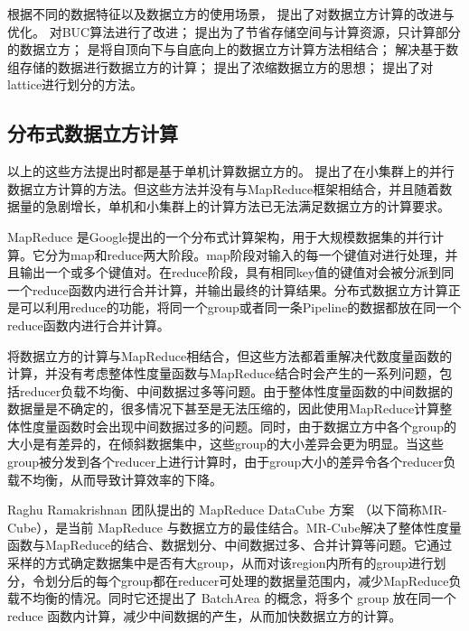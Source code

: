 根据不同的数据特征以及数据立方的使用场景，\cite{han2001efficient} \cite{harinarayan1996implementing} \cite{xin2003star}  \cite{zhao1997array}  \cite{wang2002condensed} \cite{ross1997fast} 提出了对数据立方计算的改进与优化。\cite{han2001efficient} 对BUC算法进行了改进； \cite{harinarayan1996implementing} 提出为了节省存储空间与计算资源，只计算部分的数据立方； \cite{xin2003star} 是将自顶向下与自底向上的数据立方计算方法相结合；\cite{zhao1997array} 解决基于数组存储的数据进行数据立方的计算；\cite{wang2002condensed} 提出了浓缩数据立方的思想；\cite{ross1997fast} 提出了对lattice进行划分的方法。


\subsection{分布式数据立方计算}

以上的这些方法提出时都是基于单机计算数据立方的。\cite{ng2001iceberg} \cite{dehne2002parallelizing} 提出了在小集群上的并行数据立方计算的方法。但这些方法并没有与MapReduce框架相结合，并且随着数据量的急剧增长，单机和小集群上的计算方法已无法满足数据立方的计算要求。

MapReduce \cite{dean2008mapreduce} 是Google提出的一个分布式计算架构，用于大规模数据集的并行计算。它分为map和reduce两大阶段。map阶段对输入的每一个键值对进行处理，并且输出一个或多个键值对。在reduce阶段，具有相同key值的键值对会被分派到同一个reduce函数内进行合并计算，并输出最终的计算结果。分布式数据立方计算正是可以利用reduce的功能，将同一个group或者同一条Pipeline的数据都放在同一个reduce函数内进行合并计算。

\cite{abello2011building} \cite{wang2010mapreducemerge} \cite{sergey2009applying} \cite{lee2012efficient} 将数据立方的计算与MapReduce相结合，但这些方法都着重解决代数度量函数的计算，并没有考虑整体性度量函数与MapReduce结合时会产生的一系列问题，包括reducer负载不均衡、中间数据过多等问题。由于整体性度量函数的中间数据的数据量是不确定的，很多情况下甚至是无法压缩的，因此使用MapReduce计算整体性度量函数时会出现中间数据过多的问题。同时，由于数据立方中各个group的大小是有差异的，在倾斜数据集中，这些group的大小差异会更为明显。当这些group被分发到各个reducer上进行计算时，由于group大小的差异令各个reducer负载不均衡，从而导致计算效率的下降。

Raghu Ramakrishnan 团队提出的 MapReduce DataCube 方案 \cite{nandi2012data} \cite{nandi2011distributed}（以下简称MR-Cube），是当前 MapReduce 与数据立方的最佳结合。MR-Cube解决了整体性度量函数与MapReduce的结合、数据划分、中间数据过多、合并计算等问题。它通过采样的方式确定数据集中是否有大group，从而对该region内所有的group进行划分，令划分后的每个group都在reducer可处理的数据量范围内，减少MapReduce负载不均衡的情况。同时它还提出了 BatchArea 的概念，将多个 group 放在同一个 reduce 函数内计算，减少中间数据的产生，从而加快数据立方的计算。

